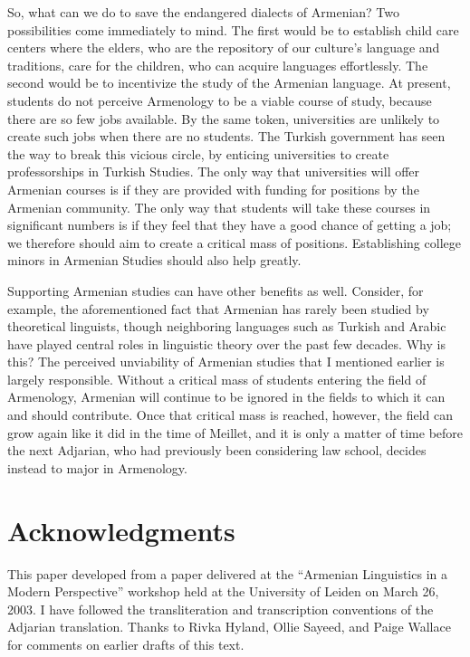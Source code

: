 \documentclass[output=paper]{langscibook}
\begin{document}
So, what can we do to save the endangered dialects of Armenian? Two possibilities come immediately to mind. The first would be to establish child care centers where the elders, who are the repository of our culture's language and traditions, care for the children, who can acquire languages effortlessly. The second would be to incentivize the study of the Armenian language. At present, students do not perceive Armenology to be a viable course of study, because there are so few jobs available. By the same token, universities are unlikely to create such jobs when there are no students. The Turkish government has seen the way to break this vicious circle, by enticing universities to create professorships in Turkish Studies. The only way that universities will offer Armenian courses is if they are provided with funding for positions by the Armenian community. The only way that students will take these courses in significant numbers is if they feel that they have a good chance of getting a job; we therefore should aim to create a critical mass of positions. Establishing college minors in Armenian Studies should also help greatly.

Supporting Armenian studies can have other benefits as well. Consider, for example, the aforementioned fact that Armenian has rarely been studied by theoretical linguists, though neighboring languages such as Turkish and Arabic have played central roles in linguistic theory over the past few decades. Why is this? The perceived unviability of Armenian studies that I mentioned earlier is largely responsible. Without a critical mass of students entering the field of Armenology, Armenian will continue to be ignored in the fields to which it can and should contribute. Once that critical mass is reached, however, the field can grow again like it did in the time of Meillet, and it is only a matter of time before the next Adjarian, who had previously been considering law school, decides instead to major in Armenology.

\section*{Acknowledgments}
This paper developed from a paper delivered at the ``Armenian Linguistics in a Modern Perspective'' workshop held at the University of Leiden on March 26, 2003. I have followed the transliteration and transcription conventions of the Adjarian translation.  Thanks to Rivka Hyland, Ollie Sayeed, and Paige Wallace for comments on earlier drafts of this text.

\printbibliography[heading=subbibliography]
\end{document}
